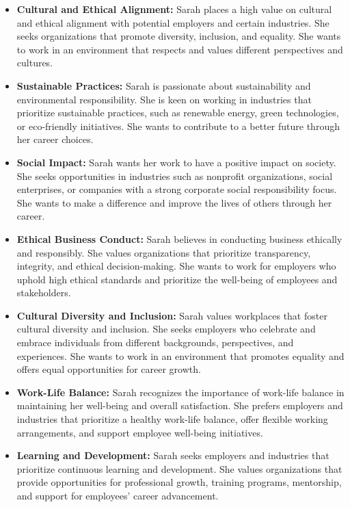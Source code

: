 \begin{itemize}
    \item \textbf{Cultural and Ethical Alignment:} Sarah places a high value on cultural and ethical alignment with potential employers and certain industries. She seeks organizations that promote diversity, inclusion, and equality. She wants to work in an environment that respects and values different perspectives and cultures.
    \item \textbf{Sustainable Practices:} Sarah is passionate about sustainability and environmental responsibility. She is keen on working in industries that prioritize sustainable practices, such as renewable energy, green technologies, or eco-friendly initiatives. She wants to contribute to a better future through her career choices.
    \item \textbf{Social Impact:} Sarah wants her work to have a positive impact on society. She seeks opportunities in industries such as nonprofit organizations, social enterprises, or companies with a strong corporate social responsibility focus. She wants to make a difference and improve the lives of others through her career.
    \item \textbf{Ethical Business Conduct:} Sarah believes in conducting business ethically and responsibly. She values organizations that prioritize transparency, integrity, and ethical decision-making. She wants to work for employers who uphold high ethical standards and prioritize the well-being of employees and stakeholders.
    \item \textbf{Cultural Diversity and Inclusion:} Sarah values workplaces that foster cultural diversity and inclusion. She seeks employers who celebrate and embrace individuals from different backgrounds, perspectives, and experiences. She wants to work in an environment that promotes equality and offers equal opportunities for career growth.
    \item \textbf{Work-Life Balance:} Sarah recognizes the importance of work-life balance in maintaining her well-being and overall satisfaction. She prefers employers and industries that prioritize a healthy work-life balance, offer flexible working arrangements, and support employee well-being initiatives.
    \item \textbf{Learning and Development:} Sarah seeks employers and industries that prioritize continuous learning and development. She values organizations that provide opportunities for professional growth, training programs, mentorship, and support for employees' career advancement.
\end{itemize}

